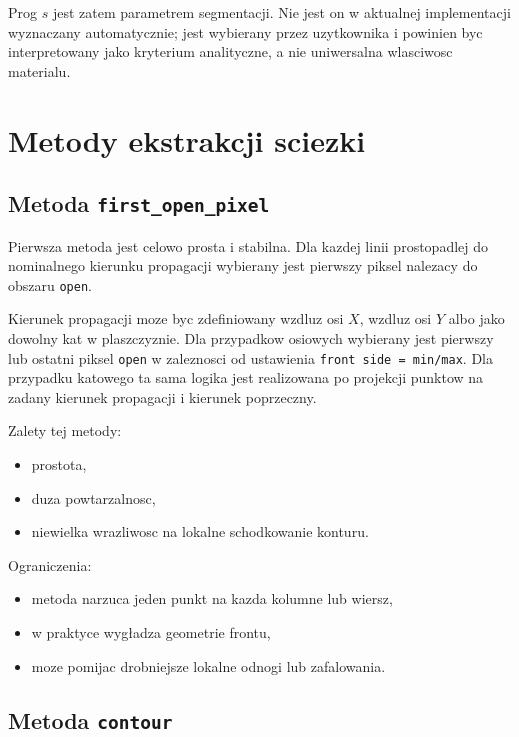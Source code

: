 \documentclass[11pt,a4paper]{article}
\begin{document}
Prog \(s\) jest zatem parametrem segmentacji. Nie jest on w aktualnej
implementacji wyznaczany automatycznie; jest wybierany przez uzytkownika i
powinien byc interpretowany jako kryterium analityczne, a nie uniwersalna
wlasciwosc materialu.

\section{Metody ekstrakcji sciezki}

\subsection{Metoda \texttt{first\_open\_pixel}}

Pierwsza metoda jest celowo prosta i stabilna. Dla kazdej linii prostopadlej
do nominalnego kierunku propagacji wybierany jest pierwszy piksel nalezacy do
obszaru \texttt{open}.

Kierunek propagacji moze byc zdefiniowany wzdluz osi \(X\), wzdluz osi \(Y\)
albo jako dowolny kat w plaszczyznie. Dla przypadkow osiowych wybierany jest
pierwszy lub ostatni piksel \texttt{open} w zaleznosci od ustawienia
\texttt{front side = min/max}. Dla przypadku katowego ta sama logika jest
realizowana po projekcji punktow na zadany kierunek propagacji i kierunek
poprzeczny.

Zalety tej metody:

\begin{itemize}[leftmargin=1.5em]
    \item prostota,
    \item duza powtarzalnosc,
    \item niewielka wrazliwosc na lokalne schodkowanie konturu.
\end{itemize}

Ograniczenia:

\begin{itemize}[leftmargin=1.5em]
    \item metoda narzuca jeden punkt na kazda kolumne lub wiersz,
    \item w praktyce wygładza geometrie frontu,
    \item moze pomijac drobniejsze lokalne odnogi lub zafalowania.
\end{itemize}

\subsection{Metoda \texttt{contour}}
\end{document}
